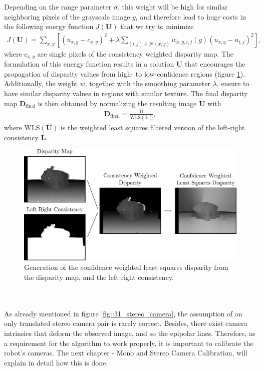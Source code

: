 Depending on the range parameter $\sigma$, this weight will be high for similar neighboring pixels of the grayscale image $g$, and therefore lead to huge costs in the following energy function $J(\bm{U})$ that we try to minimize
\begin{align}
	J(\bm{U}) = \sum_{x,y}\left[(u_{x,y}-c_{x,y})^2+\lambda\sum_{(i,j)\in\mathcal{N}(x,y)}w_{x,y,i,j}(g)(u_{x,y}-u_{i,j})^2\right],
	\label{eq::31_energy_function}
\end{align}
where $c_{x,y}$ are single pixels of the consistency weighted disparity map. The formulation of this energy function results in a solution $\bm{U}$ that encourages the propagation of disparity values from high- to low-confidence regions (figure \ref{fig::31_weighted_least_squares_disparity}). Additionally, the weight $w$, together with the smoothing parameter $\lambda$, ensure to have similar disparity values in regions with similar texture. The final disparity map $\bm{D}_\text{final}$ is then obtained by normalizing the resulting image $\bm{U}$ with
\begin{align}
	\bm{D}_\text{final} = \frac{\bm{U}}{\text{WLS}(\bm{L})},
	\label{eq::31_wls_final}
\end{align}
where $\text{WLS}(\bm{U})$ is the weighted least squares filtered version of the left-right consistency $\bm{L}$.
\begin{figure}[h!]
	\centering
	\includegraphics[scale=.28]{chapters/03_fundamentals_of_image_processing/img/weighted_least_squares_disparity.png}
	\caption{Generation of the confidence weighted least squares disparity from the disparity map, and the left-right consistency.}
	\label{fig::31_weighted_least_squares_disparity}
\end{figure}
\\\\
As already mentioned in figure \ref{fig::31_stereo_camera}, the assumption of an only translated stereo camera pair is rarely correct. Besides, there exist camera intrinsics that deform the observed image, and so the epipolar lines. Therefore, as a requirement for the algorithm to work properly, it is important to calibrate the robot's cameras. The next chapter - Mono and Stereo Camera Calibration, will explain in detail how this is done.
\FloatBarrier
